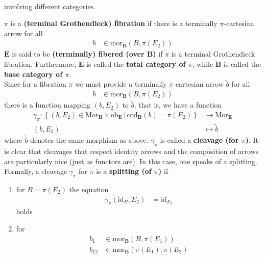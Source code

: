 \begin{enumerate}
\begin{enumerate}
\[\begin{tikzcd}[sep=large]
\end{tikzcd}
\]
involving different categories.
\end{enumerate}
$\pi$ is a \textbf{(terminal Grothendieck) fibration} if there is a terminally $\pi$-cartesian arrow for all
\begin{align*}
  b
  &\in
  \mathrm{mor}_{\mathbf{B}}
  \left(
    B,
    \pi(E_{2})
  \right)
\end{align*}
$\mathbf{E}$ is said to be \textbf{(terminally) fibered (over $\mathbf{B}$)} if $\pi$ is a terminal Grothendieck fibration.
Furthermore, $\mathbf{E}$ is called the \textbf{total category of $\pi$}, while $\mathbf{B}$ is called the \textbf{base category of $\pi$}.
\\
Since for a fibration $\pi$ we must provide a terminally $\pi$-cartesian arrow $\tilde{b}$ for all
\begin{align*}
  b
  &\in
  \mathrm{mor}_{\mathbf{B}}
  \left(
    B,
    \pi(E_{2})
  \right)
\end{align*}
there is a function mapping $(b,E_{2})$ to $\tilde{b}$, that is, we have a function
\begin{align*}
  \gamma_{\pi}
  \colon
  \left\lbrace
      (b,E_{2})
      \in
      \mathrm{Mor}_{\mathbf{B}}
      \times
      \mathrm{ob}_{\mathbf{E}}
    \,
    \vert
    \,
      \mathrm{cod}_{\mathbf{B}}(b)
      =
      \pi(E_{2})
  \right\rbrace
  &\rightarrow
  \mathrm{Mor}_{\mathbf{E}}
  \\
  (b,E_{2})
  &\mapsto
  \tilde{b}
\end{align*}
where $\tilde{b}$ denotes the same morphism as above.
$\gamma_{\pi}$ is called a \textbf{cleavage (for $\pi$)}.
It is clear that cleavages that respect identity arrows and the composition of arrows are particularly nice (just as functors are).
In this case, one speaks of a splitting.
Formally, a cleavage $\gamma_{\pi}$ for $\pi$ is a \textbf{splitting (of $\pi$)} if
\begin{enumerate}
\item[(TS1)]
for $B = \pi(E_{2})$ the equation
\begin{align*}
  \gamma_{\pi}(\mathrm{id}_{B},E_{2})
  &=
  \mathrm{id}_{E_{2}}
\end{align*}
holds
\item[(TS2)]
for
\begin{align*}
  b_{1}
  &\in
  \mathrm{mor}_{\mathbf{B}}
  \left(
    B,
    \pi(E_{1})
  \right)
  \\
  b_{12}
  &\in
  \mathrm{mor}_{\mathbf{B}}
  \left(
    \pi(E_{1}),
    \pi(E_{2})

\end{align*}
\end{enumerate}
\end{enumerate}
